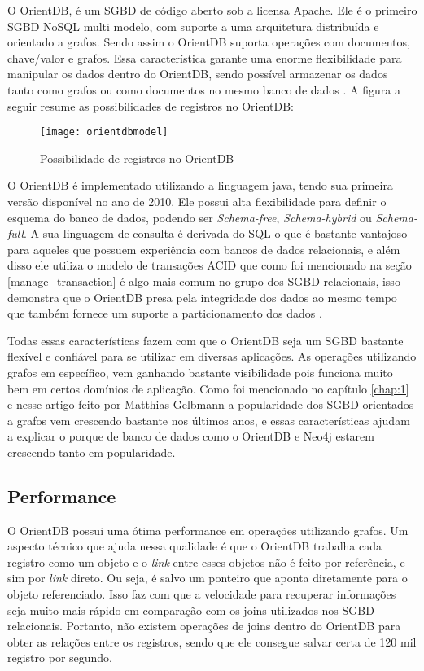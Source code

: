 	O OrientDB, é um SGBD de código aberto sob a licensa Apache. Ele é o primeiro SGBD NoSQL multi modelo, com suporte a uma arquitetura distribuída e orientado a grafos. Sendo assim o OrientDB suporta operações com documentos, chave/valor e grafos. Essa característica garante uma enorme flexibilidade para manipular os dados dentro do OrientDB, sendo possível armazenar os dados tanto como grafos ou como documentos no mesmo banco de dados \cite{OrientDB}. A figura a seguir resume as possibilidades de registros no OrientDB:
	
\begin{figure}[h]
	\centering
    \texttt{[image: orientdbmodel]}
    \caption{Possibilidade de registros no OrientDB}
    \label{fig:orientdbpossibilities}
\end{figure}
	
	O OrientDB é implementado utilizando a linguagem java, tendo sua primeira versão disponível no ano de 2010. Ele possui alta flexibilidade para definir o esquema do banco de dados, podendo ser \textit{Schema-free}, \textit{Schema-hybrid} ou \textit{Schema-full}. A sua linguagem de consulta é derivada do SQL o que é bastante vantajoso para aqueles que possuem experiência com bancos de dados relacionais, e além disso ele utiliza o modelo de transações ACID que como foi mencionado na seção \ref{manage_transaction} é algo mais comum no grupo dos SGBD relacionais, isso demonstra que o OrientDB presa pela integridade dos dados ao mesmo tempo que também fornece um suporte a particionamento dos dados \cite{OrientDB} \cite{vschart}.
	
	Todas essas características fazem com que o OrientDB seja um SGBD bastante flexível e confiável para se utilizar em diversas aplicações. As operações utilizando grafos em específico, vem ganhando bastante visibilidade pois funciona muito bem em certos domínios de aplicação. Como foi mencionado no capítulo \ref{chap:1} e nesse artigo feito por Matthias Gelbmann \cite{Graphpopularity} a popularidade dos SGBD orientados a grafos vem crescendo bastante nos últimos anos, e essas características ajudam a explicar o porque de banco de dados como o OrientDB e Neo4j estarem crescendo tanto em popularidade.
	
\subsection{Performance} \label{orient_performance}
	O OrientDB possui uma ótima performance em operações utilizando grafos. Um aspecto técnico que ajuda nessa qualidade é que o OrientDB trabalha cada registro como um objeto e o \textit{link} entre esses objetos não é feito por referência, e sim por \textit{link} direto. Ou seja, é salvo um ponteiro que aponta diretamente para o objeto referenciado. Isso faz com que a velocidade para recuperar informações seja muito mais rápido em comparação com os joins utilizados nos SGBD relacionais. Portanto, não existem operações de joins dentro do OrientDB para obter as relações entre os registros, sendo que ele consegue salvar certa de 120 mil registro por segundo.
	
